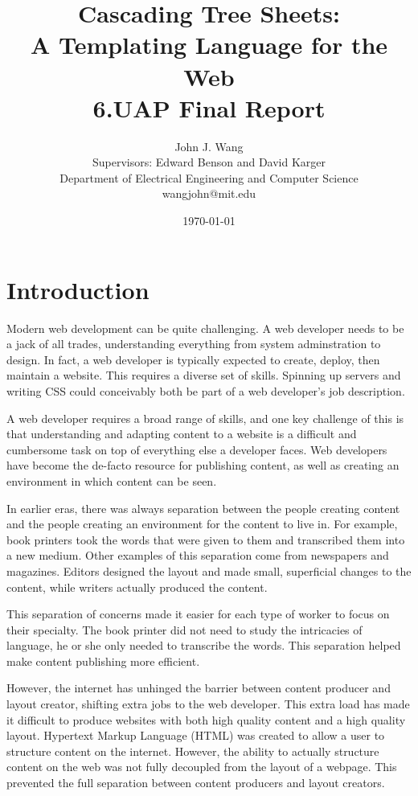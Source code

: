 \documentclass[12pt]{article}
\title{Cascading Tree Sheets:\\ 
A Templating Language for the Web\\
6.UAP Final Report
}
\author{
John J. Wang\\
Supervisors: Edward Benson and David Karger\\
Department of Electrical Engineering and Computer Science\\
wangjohn@mit.edu
}
\date{\today}
\begin{document}
\maketitle

\section{Introduction}

Modern web development can be quite challenging. A web developer needs to be a jack of all trades, understanding everything from system adminstration to design. In fact, a web developer is typically expected to create, deploy, then maintain a website. This requires a diverse set of skills. Spinning up servers and writing CSS could conceivably both be part of a web developer's job description.

A web developer requires a broad range of skills, and one key challenge of this is that understanding and adapting content to a website is a difficult and cumbersome task on top of everything else a developer faces. Web developers have become the de-facto resource for publishing content, as well as creating an environment in which content can be seen.

In earlier eras, there was always separation between the people creating content and the people creating an environment for the content to live in. For example, book printers took the words that were given to them and transcribed them into a new medium. Other examples of this separation come from newspapers and magazines. Editors designed the layout and made small, superficial changes to the content, while writers actually produced the content.

This separation of concerns made it easier for each type of worker to focus on their specialty. The book printer did not need to study the intricacies of language, he or she only needed to transcribe the words. This separation helped make content publishing more efficient.

However, the internet has unhinged the barrier between content producer and layout creator, shifting extra jobs to the web developer. This extra load has made it difficult to produce websites with both high quality content and a high quality layout. Hypertext Markup Language (HTML) was created to allow a user to structure content on the internet. However, the ability to actually structure content on the web was not fully decoupled from the layout of a webpage. This prevented the full separation between content producers and layout creators.
\end{document}
